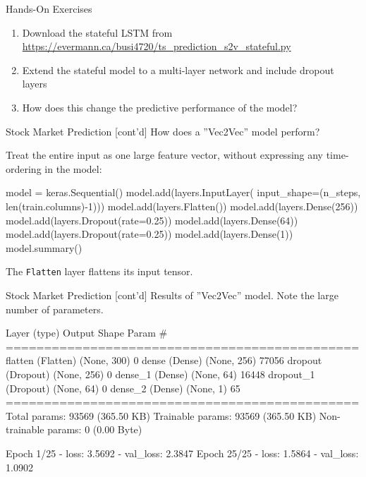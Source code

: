 \documentclass[ignorenonframetext,xcolor=x11names]{beamer}
\begin{document}
\begin{frame}[fragile]{Hands-On Exercises}
\begin{enumerate}
    \item Download the stateful LSTM from \url{https://evermann.ca/busi4720/ts_prediction_s2v_stateful.py}
    \item Extend the stateful model to a multi-layer network and include dropout layers
    \item How does this change the predictive performance of the model?
\end{enumerate}
\end{frame}

\begin{frame}[fragile]{Stock Market Prediction \small [cont'd]}
How does a ''Vec2Vec'' model perform?

Treat the entire input as one large feature vector, without expressing any time-ordering in the model:
\begin{pythoncode}
model = keras.Sequential()
model.add(layers.InputLayer(
    input_shape=(n_steps, len(train.columns)-1)))
model.add(layers.Flatten())
model.add(layers.Dense(256))
model.add(layers.Dropout(rate=0.25))
model.add(layers.Dense(64))
model.add(layers.Dropout(rate=0.25))
model.add(layers.Dense(1))
model.summary()
\end{pythoncode}
The \texttt{Flatten} layer flattens its input tensor.
\end{frame}

\begin{frame}[fragile]{Stock Market Prediction \small [cont'd]}
Results of ''Vec2Vec'' model. Note the large number of parameters.

\begin{textcode}
 Layer (type)          Output Shape    Param #   
==============================================
 flatten (Flatten)     (None, 300)     0         
 dense (Dense)         (None, 256)     77056     
 dropout (Dropout)     (None, 256)     0         
 dense_1 (Dense)       (None, 64)      16448     
 dropout_1 (Dropout)   (None, 64)      0         
 dense_2 (Dense)       (None, 1)       65        
==============================================
Total params: 93569 (365.50 KB)
Trainable params: 93569 (365.50 KB)
Non-trainable params: 0 (0.00 Byte)

Epoch 1/25  - loss: 3.5692 - val_loss: 2.3847
Epoch 25/25 - loss: 1.5864 - val_loss: 1.0902
\end{textcode}
\end{frame}
\end{document}
